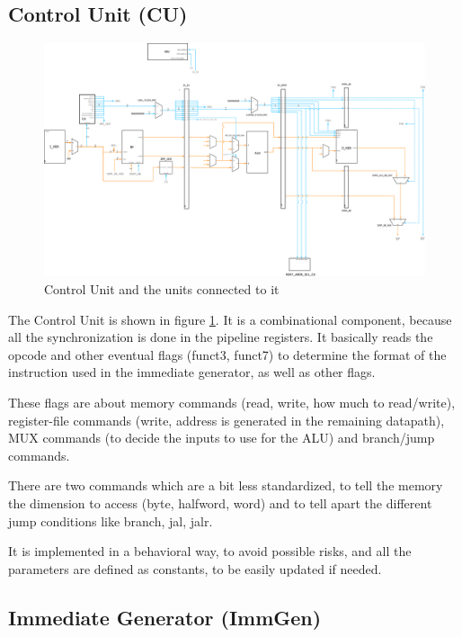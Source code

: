 \documentclass[a4paper]{article}
\begin{document}
\subsection{Control Unit (CU)}

\begin{figure}[hbtp]
    \centering
    \includegraphics[scale=0.3]{../cu/ref/schematic/cu.png}
    \caption{Control Unit and the units connected to it}
    \label{fig:cu}
\end{figure}

The Control Unit is shown in figure \ref{fig:cu}. It is a combinational component, because all the synchronization is done in the pipeline registers. It basically reads the opcode and other eventual flags (funct3, funct7) to determine the format of the instruction used in the immediate generator, as well as other flags.

These flags are about memory commands (read, write, how much to read/write), register-file commands (write, address is generated in the remaining datapath), MUX commands (to decide the inputs to use for the ALU) and branch/jump commands.

There are two commands which are a bit less standardized, to tell the memory the dimension to access (byte, halfword, word) and to tell apart the different jump conditions like branch, jal, jalr.

It is implemented in a behavioral way, to avoid possible risks, and all the parameters are defined as constants, to be easily updated if needed.

\subsection{Immediate Generator (ImmGen)}
\end{document}
